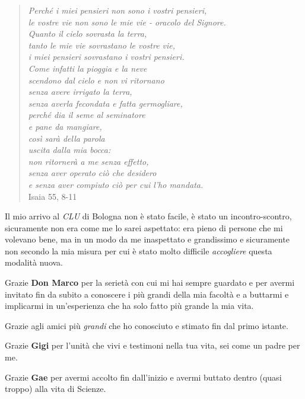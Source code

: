 \begin{verse}
    \textit{Perché i miei pensieri non sono i vostri pensieri, \\
    le vostre vie non sono le mie vie - oracolo del Signore. \\
    Quanto il cielo sovrasta la terra, \\
    tanto le mie vie sovrastano le vostre vie, \\
    i miei pensieri sovrastano i vostri pensieri. \\
    Come infatti la pioggia e la neve \\
    scendono dal cielo e non vi ritornano \\
    senza avere irrigato la terra, \\
    senza averla fecondata e fatta germogliare, \\
    perché dia il seme al seminatore \\
    e pane da mangiare, \\
    così sarà della parola \\
    uscita dalla mia bocca: \\
    non ritornerà a me senza effetto, \\
    senza aver operato ciò che desidero \\
    e senza aver compiuto ciò per cui l'ho mandata.} \\
    Isaia 55, 8-11
\end{verse}

Il mio arrivo al \textit{CLU} di Bologna non è stato facile, è stato un incontro-scontro, sicuramente non era come me lo sarei aspettato: era pieno di persone che mi volevano bene, ma in un modo da me inaspettato e grandissimo e sicuramente non secondo la mia misura per cui è stato molto difficile \textit{accogliere} questa modalità nuova.

Grazie \textbf{Don Marco} per la serietà con cui mi hai sempre guardato e per avermi invitato fin da subito a conoscere i più grandi della mia facoltà e a buttarmi e implicarmi in un'esperienza che ha solo fatto più grande la mia vita.

Grazie agli amici più \textit{grandi} che ho conosciuto e stimato fin dal primo istante.

Grazie \textbf{Gigi} per l'unità che vivi e testimoni nella tua vita, sei come un padre per me.

Grazie \textbf{Gae} per avermi accolto fin dall'inizio e avermi buttato dentro (quasi troppo) alla vita di Scienze.

